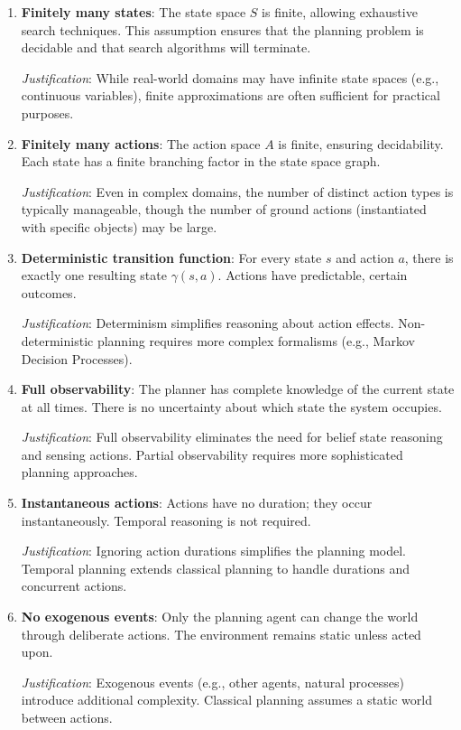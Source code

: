 \documentclass[11pt,a4paper]{article}
\theoremstyle{definition}
\theoremstyle{plain}
\theoremstyle{remark}
\begin{document}
\begin{enumerate}
    \item \textbf{Finitely many states}: The state space $S$ is finite, allowing exhaustive search techniques. This assumption ensures that the planning problem is decidable and that search algorithms will terminate.
    
    \textit{Justification}: While real-world domains may have infinite state spaces (e.g., continuous variables), finite approximations are often sufficient for practical purposes.
    
    \item \textbf{Finitely many actions}: The action space $A$ is finite, ensuring decidability. Each state has a finite branching factor in the state space graph.
    
    \textit{Justification}: Even in complex domains, the number of distinct action types is typically manageable, though the number of ground actions (instantiated with specific objects) may be large.
    
    \item \textbf{Deterministic transition function}: For every state $s$ and action $a$, there is exactly one resulting state $\gamma(s, a)$. Actions have predictable, certain outcomes.
    
    \textit{Justification}: Determinism simplifies reasoning about action effects. Non-deterministic planning requires more complex formalisms (e.g., Markov Decision Processes).
    
    \item \textbf{Full observability}: The planner has complete knowledge of the current state at all times. There is no uncertainty about which state the system occupies.
    
    \textit{Justification}: Full observability eliminates the need for belief state reasoning and sensing actions. Partial observability requires more sophisticated planning approaches.
    
    \item \textbf{Instantaneous actions}: Actions have no duration; they occur instantaneously. Temporal reasoning is not required.
    
    \textit{Justification}: Ignoring action durations simplifies the planning model. Temporal planning extends classical planning to handle durations and concurrent actions.
    
    \item \textbf{No exogenous events}: Only the planning agent can change the world through deliberate actions. The environment remains static unless acted upon.
    
    \textit{Justification}: Exogenous events (e.g., other agents, natural processes) introduce additional complexity. Classical planning assumes a static world between actions.
\end{enumerate}
\end{document}

